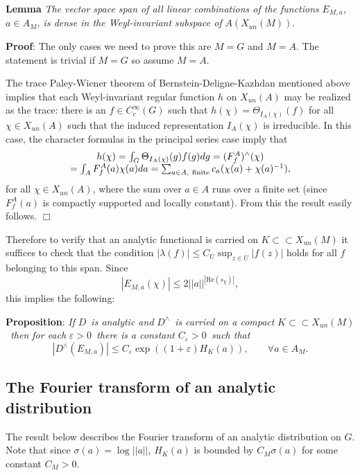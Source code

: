 \documentclass[11pt, a4paper]{article}
\begin{document}
{\bf Lemma} {\em The vector space span of all linear combinations of the
functions }$E_{M,a}${\em , }$a\in A_M${\em , is dense in the Weyl-invariant subspace of }$A(X_{un}(M))$.

{\bf Proof}: The only cases we need to prove this are $M=G$ and $M=A$. The
statement is trivial if $M=G$ so assume $M=A$.

The trace Paley-Wiener theorem of Bernstein-Deligne-Kazhdan mentioned above
implies that each Weyl-invariant regular function $h$ on $X_{un}(A)$ may be realized as the
trace: there is an $f\in C_c^\infty (G)$ such that $h(\chi )=\Theta
_{I_A(\chi )}(f)$ for all $\chi \in X_{un}(A)$ such that the induced
representation $I_A(\chi )$ is irreducible. In this case, the character
formulas in the principal series case imply that
\[
\begin{array}{c}
h(\chi )=\int_G\Theta _{I_A(\chi )}(g)f(g)dg=(F_f^A)^{\wedge }(\chi ) \\ 
=\int_AF_f^A(a)\chi (a)da=\sum_{a\in A,\ {\rm finite}} c_a(\chi(a)+\chi(a)^{-1}),
\end{array}
\]
for all $\chi \in X_{un}(A)$, where the sum over $a\in A$ runs over a finite
set (since $F_f^A(a)$ is compactly supported and locally constant). From this the result easily
follows. $\Box $

Therefore to verify that an analytic functional is carried on $K\subset \subset
X_{un}(M)$ it suffices to check that the condition $|\lambda (f)|\leq
C_U\sup _{z\in U}|f(z)|$ holds for all $f$ belonging to this span. Since
\[
|E_{M,a}(\chi)|\leq 2||a||^{|\mathrm{Re}(s_\chi)|},
\]
this implies the following:

{\bf Proposition}: {\em If }$D${\em \ is analytic and }$D^{\wedge }${\em \
is carried on a compact }$K\subset \subset X_{un}(M)${\em \ then for each }$%
\varepsilon >0${\em \ there is a constant }$C_\varepsilon >0${\em \ such that%
}
\[
|D^{\wedge }(E_{M,a})|\leq C_\varepsilon \exp ((1+\varepsilon
)H_K(a)),\;\;\;\;\;\;\;\forall a\in A_M.
\]

\subsection{The Fourier transform of an analytic distribution}

The result below describes the Fourier transform of an analytic distribution
on $G$. Note that since $\sigma (a)=\log ||a||$, $H_K(a)$ is bounded by $C_M\sigma (a)$ for some constant $C_M>0$.
\end{document}
